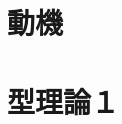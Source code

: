 \documentclass[dvipdfmx]{jsarticle}
\begin{document}
\section{動機}

\newpage

%

%

\section{型理論１}

\newpage

\newpage

\end{document}
